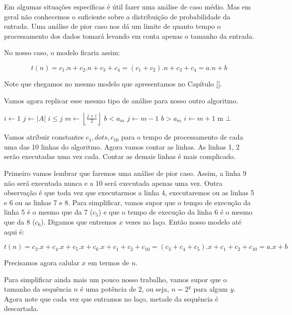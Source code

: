 Em algumas situações específicas é útil fazer uma análise de caso médio.
Mas em geral não conhecemos o suficiente sobre a distribuição de probabilidade da entrada.
Uma análise de pior caso nos dá um limite de quanto tempo o processamento dos dados tomará levando em conta apenas o tamanho da entrada.

No nosso caso, o modelo ficaria assim:

\begin{displaymath}
  t(n) = c_1.n + c_2.n + c_3 + c_4 = (c_1 + c_2).n + c_3 + c_4 = a.n + b
\end{displaymath}

Note que chegamos no mesmo modelo que apresentamos no Capítulo \ref{}.

Vamos agora replicar esse mesmo tipo de análise para nosso outro algoritmo.
\begin{codebox}
  \li $i \gets 1$
  \li $j \gets |A|$
  \li \While $i \leq j$
  \li \Do $m \gets \left \lfloor{\frac{j+i}{2}}\right\rfloor$
  \li \If $b < a_m$
  \li     \Then $j \gets m - 1$
  \li \Else
      \If $b > a_m$
  \li      \Then $i \gets m + 1$
  \li \Else \Return m 
      \End
  \End
  \End
  \li \Return $\bot$
\end{codebox}

Vamos atribuir constantes $c_1, dots, c_{10}$ para o tempo de processamento de cada uma das 10 linhas do algoritmo.
Agora vamos contar as linhas.
As linhas 1, 2 serão executadas uma vez cada.
Contar as demais linhas é mais complicado.

Primeiro vamos lembrar que faremos uma análise de pior caso.
Assim, a linha 9 não será executada nunca e a 10 será executada apenas uma vez.
Outra observação é que toda vez que executarmos a linha 4, executaremos ou as linhas 5 e 6 ou as linhas 7 e 8.
Para simplificar, vamos supor que o tempo de execução da linha 5 é o mesmo que da 7 ($c_5$) e que o tempo de execução da linha 6 é o mesmo que da 8 ($c_6$).
Digamos que entremos $x$ vezes no laço.
Então nosso modelo até aqui é:

\begin{displaymath}
  t(n) = c_3.x + c_4.x + c_5.x + c_6.x + c_1 + c_2 + c_{10} = (c_3 + c_4 + c_5).x + c_1 + c_2 + c_{10} = a.x + b 
\end{displaymath}

Precisamos agora calular $x$ em termos de $n$.

Para simplificar ainda mais um pouco nosso trabalho, vamos supor que o tamanho da sequência $n$ é uma potência de 2, ou seja, $n = 2^y$ para algum $y$.
Agora note que cada vez que entramos no laço, metade da sequência é descartada.

